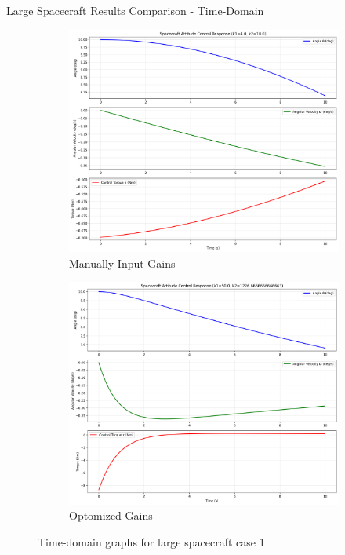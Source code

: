 \documentclass{beamer}
\begin{document}
\begin{frame}{Large Spacecraft Results Comparison - Time-Domain}
    \begin{figure}[H]
    \label{Fig. 1}
    \centering
    \begin{subfigure}[b]{0.48\columnwidth}
        \label{Fig. 1.A}
        \centering
        \includegraphics[width=\linewidth]{base_time_domain(1).pdf}
        \caption{Manually Input Gains}
        \label{fig:subfig1}
    \end{subfigure}
    \hfill
    \begin{subfigure}[b]{0.48\columnwidth}
        \label{Fig. 1.B}
        \centering
        \includegraphics[width=\linewidth]{best_time_domain(1).pdf}
        \caption{Optomized Gains}
        \label{fig:subfig2}
    \end{subfigure}
    \caption{Time-domain graphs for large spacecraft case 1}
    \label{fig:combined}
\end{figure}
\end{frame}
\end{document}
